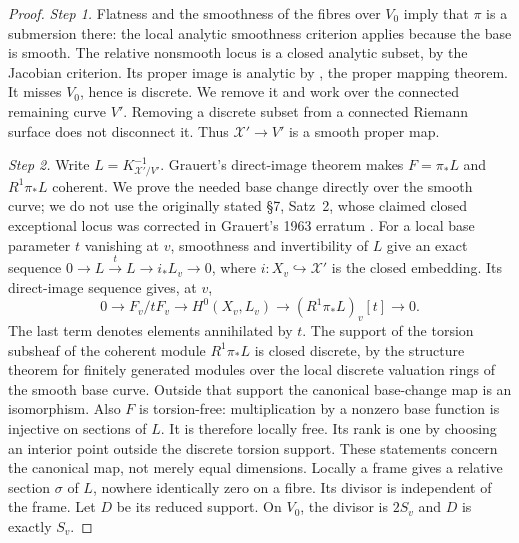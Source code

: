 \begin{proof}
\par\noindent\textit{Step 1.} Flatness and the smoothness of the fibres over \(V_0\) imply that
\(\pi\) is a submersion there: the local analytic smoothness criterion
applies because the base is smooth. The relative nonsmooth locus is a
closed analytic subset, by the Jacobian criterion. Its proper image is
analytic by \cite[\S7, Satz~1]{Grauert1960D}, the proper mapping theorem.
It misses \(V_0\), hence is discrete. We remove it and work over the
connected remaining curve \(V'\). Removing a discrete subset from a
connected Riemann surface does not disconnect it. Thus
\(\mathcal X'\to V'\) is a smooth proper map.

\par\noindent\textit{Step 2.} Write \(L=K_{\mathcal X'/V'}^{-1}\). Grauert's direct-image theorem \cite[\S6, Hauptsatz~I]{Grauert1960D} makes \(F=\pi_*L\) and \(R^1\pi_*L\)
coherent. We prove the needed base change directly over the smooth
curve; we do not use the originally stated \S7, Satz~2, whose claimed
closed exceptional locus was corrected in Grauert's 1963 erratum \cite[item~2, p.~36]{Grauert1963ErratumD}.
For a local base parameter \(t\) vanishing at \(v\), smoothness and
invertibility of \(L\) give an exact sequence
\(0\to L\xrightarrow{t}L\to i_*L_v\to0\), where
\(i:X_v\hookrightarrow\mathcal X'\) is the closed embedding.
Its direct-image sequence gives, at \(v\),
\[
 0\longrightarrow F_v/tF_v\longrightarrow H^0(X_v,L_v)
 \longrightarrow (R^1\pi_*L)_v[t]\longrightarrow0.
\]
The last term denotes elements annihilated by \(t\). The support of
the torsion subsheaf of the coherent module \(R^1\pi_*L\) is closed
discrete, by the structure theorem for finitely generated modules
over the local discrete valuation rings of the smooth base curve.
Outside that support the canonical base-change map is an isomorphism.
Also \(F\) is torsion-free: multiplication by a nonzero base function
is injective on sections of \(L\). It is therefore locally free.
Its rank is one by choosing an interior point outside the discrete
torsion support. These statements concern the canonical map, not
merely equal dimensions.
Locally a frame gives a relative section \(\sigma\) of \(L\),
nowhere identically zero on a fibre. Its divisor is independent of the
frame. Let \(D\) be its reduced support. On \(V_0\), the divisor is
\(2S_v\) and \(D\) is exactly \(S_v\).


\end{proof}
